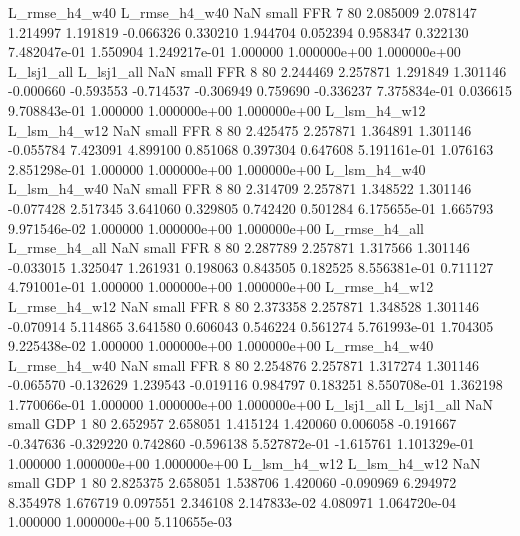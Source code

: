 L_rmse_h4_w40 L_rmse_h4_w40                   NaN      small      FFR                 7 80 2.085009       2.078147 1.214997       1.191819   -0.066326      0.330210      1.944704     0.052394       0.958347  0.322130 7.482047e-01     1.550904   1.249217e-01            1.000000    1.000000e+00        1.000000e+00
   L_lsj1_all    L_lsj1_all                   NaN      small      FFR                 8 80 2.244469       2.257871 1.291849       1.301146   -0.000660     -0.593553     -0.714537    -0.306949       0.759690 -0.336237 7.375834e-01     0.036615   9.708843e-01            1.000000    1.000000e+00        1.000000e+00
 L_lsm_h4_w12  L_lsm_h4_w12                   NaN      small      FFR                 8 80 2.425475       2.257871 1.364891       1.301146   -0.055784      7.423091      4.899100     0.851068       0.397304  0.647608 5.191161e-01     1.076163   2.851298e-01            1.000000    1.000000e+00        1.000000e+00
 L_lsm_h4_w40  L_lsm_h4_w40                   NaN      small      FFR                 8 80 2.314709       2.257871 1.348522       1.301146   -0.077428      2.517345      3.641060     0.329805       0.742420  0.501284 6.175655e-01     1.665793   9.971546e-02            1.000000    1.000000e+00        1.000000e+00
L_rmse_h4_all L_rmse_h4_all                   NaN      small      FFR                 8 80 2.287789       2.257871 1.317566       1.301146   -0.033015      1.325047      1.261931     0.198063       0.843505  0.182525 8.556381e-01     0.711127   4.791001e-01            1.000000    1.000000e+00        1.000000e+00
L_rmse_h4_w12 L_rmse_h4_w12                   NaN      small      FFR                 8 80 2.373358       2.257871 1.348528       1.301146   -0.070914      5.114865      3.641580     0.606043       0.546224  0.561274 5.761993e-01     1.704305   9.225438e-02            1.000000    1.000000e+00        1.000000e+00
L_rmse_h4_w40 L_rmse_h4_w40                   NaN      small      FFR                 8 80 2.254876       2.257871 1.317274       1.301146   -0.065570     -0.132629      1.239543    -0.019116       0.984797  0.183251 8.550708e-01     1.362198   1.770066e-01            1.000000    1.000000e+00        1.000000e+00
   L_lsj1_all    L_lsj1_all                   NaN      small      GDP                 1 80 2.652957       2.658051 1.415124       1.420060    0.006058     -0.191667     -0.347636    -0.329220       0.742860 -0.596138 5.527872e-01    -1.615761   1.101329e-01            1.000000    1.000000e+00        1.000000e+00
 L_lsm_h4_w12  L_lsm_h4_w12                   NaN      small      GDP                 1 80 2.825375       2.658051 1.538706       1.420060   -0.090969      6.294972      8.354978     1.676719       0.097551  2.346108 2.147833e-02     4.080971   1.064720e-04            1.000000    1.000000e+00        5.110655e-03
